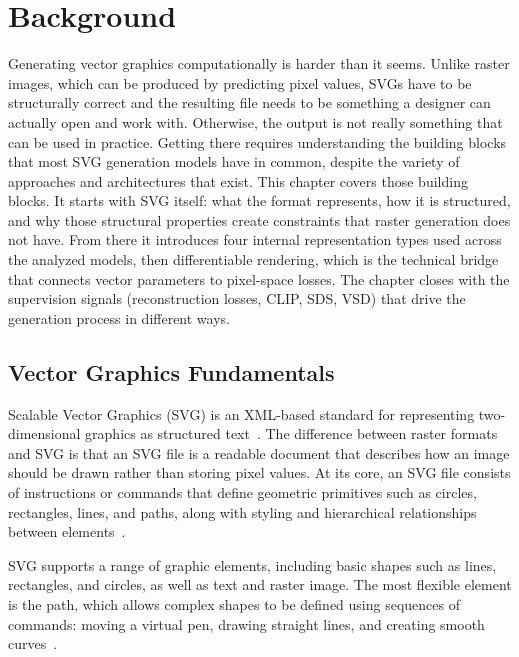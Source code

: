 \chapter{Background}\label{ch:Background}

Generating vector graphics computationally is harder than 
it seems. Unlike raster images, which can be produced by 
predicting pixel values, SVGs have to be 
structurally correct and the resulting file needs 
to be something a designer can actually open and work with. Otherwise,
the output is not really something that can be used in practice.   
Getting there requires understanding the building 
blocks that most SVG generation models have in common, 
despite the variety of approaches and architectures that exist. 
This chapter covers those building blocks. It starts with 
SVG itself: what the format represents, how it is structured, 
and why those structural properties create constraints that 
raster generation does not have. From there it introduces 
four internal representation types used across the analyzed 
models, then differentiable rendering, which is the technical 
bridge that connects vector parameters to pixel-space losses. 
The chapter closes with the supervision signals (reconstruction 
losses, CLIP, SDS, VSD) that drive the generation process in 
different ways.

\section{Vector Graphics Fundamentals}
\label{sec:vector_fundamentals}

Scalable Vector Graphics (SVG) is an XML-based standard for 
representing two-dimensional graphics as structured 
text~\cite{eisenbergSVGEssentialsProducing20}. The difference between raster formats and SVG 
is that an SVG file is a readable document that describes how an image should 
be drawn rather than storing pixel values. At its core, an SVG file consists of instructions or commands that 
define geometric primitives such as circles, rectangles, lines, and 
paths, along with styling and hierarchical relationships between 
elements~\cite{quintScalableVectorGraphics2003}.

SVG supports a range of graphic elements, including basic shapes 
such as lines, rectangles, and circles, as well as text and 
raster image. The most flexible element is the path, 
which allows complex shapes to be defined using sequences of 
commands: moving a virtual pen, drawing straight lines, and 
creating smooth curves~\cite{eisenbergSVGEssentialsProducing20}.


